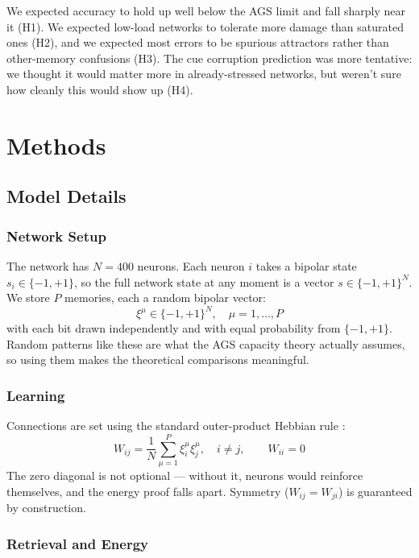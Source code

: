 \documentclass[11pt,a4paper]{article}
\begin{document}
We expected accuracy to hold up well below the AGS limit and fall sharply near it (H1). We expected low-load networks to tolerate more damage than saturated ones (H2), and we expected most errors to be spurious attractors rather than other-memory confusions (H3). The cue corruption prediction was more tentative: we thought it would matter more in already-stressed networks, but weren't sure how cleanly this would show up (H4).

\section{Methods}

\subsection{Model Details}

\subsubsection{Network Setup}

The network has $N = 400$ neurons. Each neuron $i$ takes a bipolar state $s_i \in \{-1, +1\}$, so the full network state at any moment is a vector $s \in \{-1,+1\}^N$. We store $P$ memories, each a random bipolar vector:
\begin{equation}
\xi^\mu \in \{-1, +1\}^N, \quad \mu = 1, \ldots, P
\end{equation}
with each bit drawn independently and with equal probability from $\{-1,+1\}$. Random patterns like these are what the AGS capacity theory actually assumes, so using them makes the theoretical comparisons meaningful.

\subsubsection{Learning}

Connections are set using the standard outer-product Hebbian rule \cite{hopfield1982}:
\begin{equation}
W_{ij} = \frac{1}{N} \sum_{\mu=1}^P \xi_i^\mu \xi_j^\mu, \quad i \neq j, \qquad W_{ii} = 0
\end{equation}
The zero diagonal is not optional --- without it, neurons would reinforce themselves, and the energy proof falls apart. Symmetry ($W_{ij} = W_{ji}$) is guaranteed by construction.

\subsubsection{Retrieval and Energy}
\end{document}
